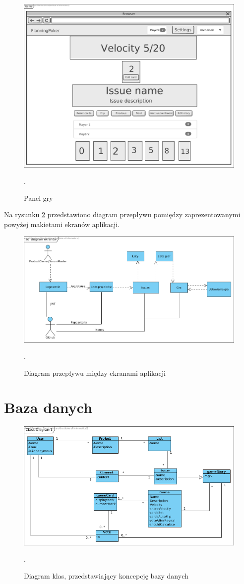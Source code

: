 \begin{figure}[H]
	\centering\includegraphics[width=.7\textwidth]{img/GameScreen}
	\caption{Panel gry}.
	\label{rys:GameScreen}
\end{figure}

Na rysunku \ref{rys:ScreensDiagram} przedstawiono diagram przepływu pomiędzy
zaprezentowanymi powyżej makietami ekranów aplikacji.

\begin{figure}[H]
	\centering\includegraphics[width=\textwidth]{img/ScreensDiagram}
	\caption{Diagram przepływu między ekranami aplikacji}.
	\label{rys:ScreensDiagram}
\end{figure}

\section{Baza danych}

\begin{figure}[H]
	\centering\includegraphics[width=\textwidth]{img/ClassDiagram}
	\caption{Diagram klas, przedstawiający koncepcję bazy danych}.
	\label{rys:ClassDiagram}
\end{figure}

